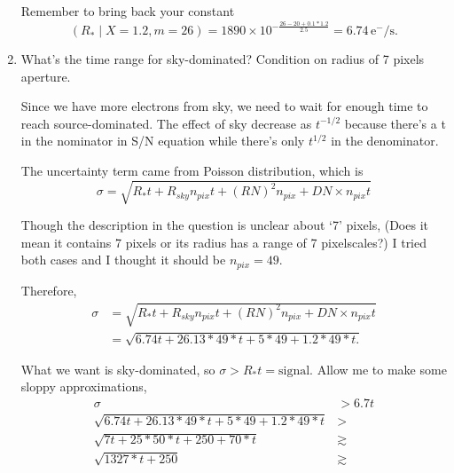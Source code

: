 \documentclass[12pt,letterpaper]{article}
\begin{document}
\begin{enumerate}
    Remember to bring back your constant
    \begin{equation}
        (R_{*} \mid X=1.2, m=26) = 1890
            \times 10^{ - \frac{26 - 20 + 0.1 * 1.2}{2.5} } 
            = 6.74 \, \mathrm{e^-/s}.   
    \end{equation}


    \item What's the time range for sky-dominated? Condition on radius of 7 pixels aperture.
    
    Since we have more electrons from sky, we need to wait for enough time
    to reach source-dominated.
    The effect of sky decrease as $t^{-1/2}$ because there's a t in the 
    nominator in S/N equation while there's only $t^{1/2}$ in the 
    denominator.
    
    The uncertainty term came from Poisson distribution, which is
    \begin{equation}
        \sigma = \sqrt{  
            R_* t + R_{sky} n_{pix} t + (RN)^2 n_{pix} + DN \times n_{pix} t
        }
    \end{equation}

    Though the description in the question is unclear about `7' pixels,
    (Does it mean it contains 7 pixels or its radius has a range of 7 pixelscales?)
    I tried both cases and I thought it should be $n_{pix} = 49$. 
    
    Therefore,
    \begin{equation}
        \begin{split}
            \sigma &= \sqrt{  
                R_* t + R_{sky} n_{pix} t + (RN)^2 n_{pix} + DN \times n_{pix} t
            }\\
                &= \sqrt{
                6.74t + 26.13*49*t + 5*49 + 1.2*49*t.
            }
        \end{split}
    \end{equation}

    What we want is sky-dominated, so $\sigma > R_* t = \mathrm{signal}$.
    Allow me to make some sloppy approximations,    
    \begin{equation}
        \begin{split}
            \sigma &> 6.7 t\\
            \sqrt{6.74t + 26.13*49*t + 5*49 + 1.2*49*t} &> \\
            \sqrt{7t + 25*50*t + 250 + 70*t} &\gtrsim \\
            \sqrt{1327*t + 250 } &\gtrsim \\
        \end{split}
    \end{equation}


\end{enumerate}
\end{document}
